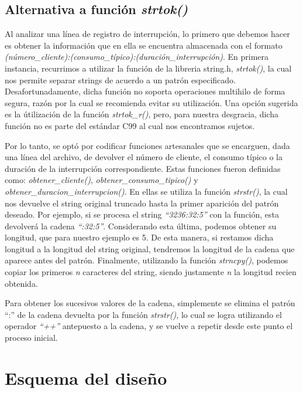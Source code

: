 \documentclass{article}
\begin{document}
\subsection{Alternativa a función \textit{strtok()}}

	Al analizar una línea de registro de interrupción, lo primero que debemos hacer es obtener la información que en ella se encuentra almacenada con el formato \textit{(número\_cliente):(consumo\_típico):(duración\_interrupción)}. En primera instancia, recurrimos a utilizar la función de la libreria string.h, \textit{strtok()}, la cual nos permite separar strings de acuerdo a un patrón especificado. Desafortunadamente, dicha función no soporta operaciones multihilo de forma segura, razón por la cual se recomienda evitar su utilización. Una opción sugerida es la útilización de la función \textit{strtok\_r()}, pero, para nuestra desgracia, dicha función no es parte del estándar C99 al cual nos encontramos sujetos.
	\par
	Por lo tanto, se optó por codificar funciones artesanales que se encarguen, dada una línea del archivo, de devolver el número de cliente, el consumo típico o la duración de la interrupción correspondiente. Estas funciones fueron definidas como: \textit{obtener\_cliente()}, \textit{obtener\_consumo\_tipico()} y \textit{obtener\_duracion\_interrupcion()}. En ellas se utiliza la función \textit{strstr()}, la cual nos devuelve el string original truncado hasta la primer aparición del patrón deseado. Por ejemplo, si se procesa el string \textit{``3236:32:5''} con la función, esta devolverá la cadena \textit{``:32:5''}. Considerando esta última, podemos obtener su longitud, que para nuestro ejemplo es 5. De esta manera, si restamos dicha longitud a la longitud del string original, tendremos la longitud de la cadena que aparece antes del patrón. Finalmente, utilizando la función \textit{strncpy()}, podemos copiar los primeros \textit{n} caracteres del string, siendo justamente \textit{n} la longitud recien obtenida.
	\par
	Para obtener los sucesivos valores de la cadena, simplemente se elimina el patrón ``:'' de la cadena devuelta por la función \textit{strstr()}, lo cual se logra utilizando el operador \textit{``++''} antepuesto a la cadena, y se vuelve a repetir desde este punto el proceso inicial.
	\bigskip\smallskip




\section{Esquema del diseño}
\end{document}
